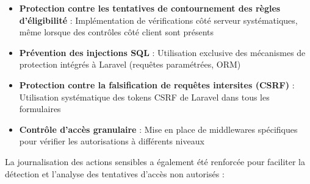 \documentclass[french,12pt]{report} %
\begin{document}
\begin{itemize}
    \item \textbf{Protection contre les tentatives de contournement des règles d'éligibilité} : Implémentation de vérifications côté serveur systématiques, même lorsque des contrôles côté client sont présents
    \item \textbf{Prévention des injections SQL} : Utilisation exclusive des mécanismes de protection intégrés à Laravel (requêtes paramétrées, ORM)
    \item \textbf{Protection contre la falsification de requêtes intersites (CSRF)} : Utilisation systématique des tokens CSRF de Laravel dans tous les formulaires
    \item \textbf{Contrôle d'accès granulaire} : Mise en place de middlewares spécifiques pour vérifier les autorisations à différents niveaux
\end{itemize}

La journalisation des actions sensibles a également été renforcée pour faciliter la détection et l'analyse des tentatives d'accès non autorisés :
\end{document}

